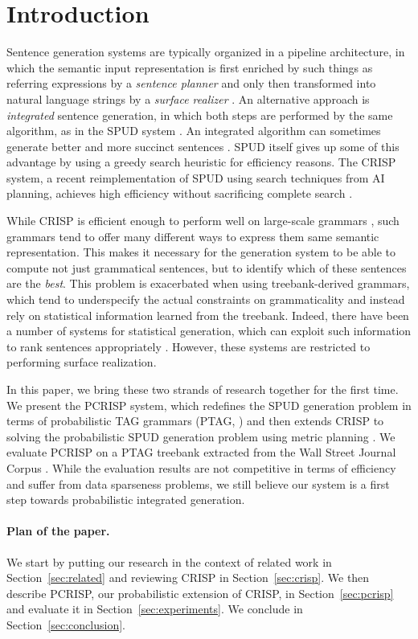 \section{Introduction}

Sentence generation systems are typically organized in a pipeline
architecture, in which the semantic input representation is first
enriched by such things as referring expressions by a \emph{sentence
  planner} and only then transformed into natural language strings by
a \emph{surface realizer} \cite{reiterdale2000}.  An alternative
approach is \emph{integrated} sentence generation, in which both steps
are performed by the same algorithm, as in the SPUD system
\cite{Stone2003a}.  An integrated algorithm can sometimes generate
better and more succinct sentences \cite{stone98textual}.  SPUD itself
gives up some of this advantage by using a greedy search heuristic
for efficiency reasons.  The CRISP system, a recent reimplementation
of SPUD using search techniques from AI planning, achieves high
efficiency without sacrificing complete search
\cite{kollerstone2007,KolHof10}.

While CRISP is efficient enough to perform well on large-scale
grammars \cite{kollerpetrick2009}, such grammars tend to offer many
different ways to express them same semantic representation.  This
makes it necessary for the generation system to be able to compute not
just grammatical sentences, but to identify which of these sentences
are the \emph{best}. This problem is exacerbated when using
treebank-derived grammars, which tend to underspecify the actual
constraints on grammaticality and instead rely on statistical
information learned from the treebank.  Indeed, there have been a
number of systems for statistical generation, which can exploit such
information to rank sentences appropriately
\cite{langkildeknight1998,whitebaldridge2003,belz2008}.  However,
these systems are restricted to performing surface realization.

In this paper, we bring these two strands of research together for the
first time.  We present the PCRISP system, which redefines the SPUD
generation problem in terms of probabilistic TAG grammars (PTAG,
\cite{resnik1992}) and then extends CRISP to solving the probabilistic
SPUD generation problem using metric planning \cite{hoffmann2003}.  We
evaluate PCRISP on a PTAG treebank extracted from the Wall Street
Journal Corpus \cite{chenschanker2004}.  While the evaluation results
are not competitive in terms of efficiency and suffer from data
sparseness problems, we still believe our system is a first step
towards probabilistic integrated generation.

\paragraph{Plan of the paper.} We start by putting our research in the
context of related work in Section~\ref{sec:related} and reviewing
CRISP in Section~\ref{sec:crisp}.  We then describe PCRISP, our
probabilistic extension of CRISP, in Section~\ref{sec:pcrisp} and
evaluate it in Section~\ref{sec:experiments}. We conclude in
Section~\ref{sec:conclusion}. 



